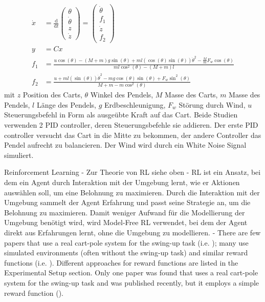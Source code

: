 \begin{align}
    \dot{x} &= \frac{\mathrm{d}}{\mathrm{d}t}\begin{pmatrix}
        \theta \\
        \dot{\theta} \\
        z \\
        \dot{z}
    \end{pmatrix} = \begin{pmatrix}
        \dot{\theta} \\
        f_1 \\
        \dot{z} \\
        f_2
    \end{pmatrix} \\
    y &= Cx \\
    f_1 &= \frac{u\cos(\theta) - (M+m)g\sin(\theta) + ml(\cos(\theta)\sin(\theta))\dot{\theta}^2 - \frac{M}{m}F_w\cos(\theta)}{ml\cos^2(\theta) - (M+m)l} \\
    f_2 &= \frac{u + ml(\sin(\theta))\dot{\theta}^2 - mg\cos(\theta)\sin(\theta) + F_w\sin^2(\theta)}{M+m-m\cos^2(\theta)}
\end{align}
mit $z$ Position des Carts, $\theta$ Winkel des Pendels, $M$ Masse des Carts, $m$ Masse des Pendels, $l$ Länge des Pendels, $g$ Erdbeschleunigung, $F_w$ Störung durch Wind, $u$ Steuerungsbefehl in Form als ausgeübte Kraft auf das Cart. Beide Studien verwenden 2 PID controller, deren Steuerungsbefehle sie addieren. Der erste PID controller versucht das Cart in die Mitte zu bekommen, der andere Controller das Pendel aufrecht zu balancieren. Der Wind wird durch ein White Noise Signal simuliert.

Reinforcement Learning
- Zur Theorie von RL siehe oben
- RL ist ein Ansatz, bei dem ein Agent durch Interaktion mit der Umgebung lernt, wie er Aktionen auswählen soll, um eine Belohnung zu maximieren. Durch die Interaktion mit der Umgebung sammelt der Agent Erfahrung und passt seine Strategie an, um die Belohnung zu maximieren. Damit weniger Aufwand für die Modellierung der Umgebung benötigt wird, wird Model-Free RL verwendet, bei dem der Agent direkt aus Erfahrungen lernt, ohne die Umgebung zu modellieren.
- There are few papers that use a real cart-pole system for the swing-up task (i.e. \cite{nayante_reinforcement_2021,pilcolearner_cart-pole_2011,deisenroth_pilco_2011}); many use simulated environments (often without the swing-up task) and similar reward functions (i.e. \cite{kumar_balancing_2020,liu_swing-up_2023,kimura_stochastic_1999}). Different approaches for reward functions are listed in the Experimental Setup section. Only one paper was found that uses a real cart-pole system for the swing-up task and was published recently, but it employs a simple reward function (\cite{nayante_reinforcement_2021}).

